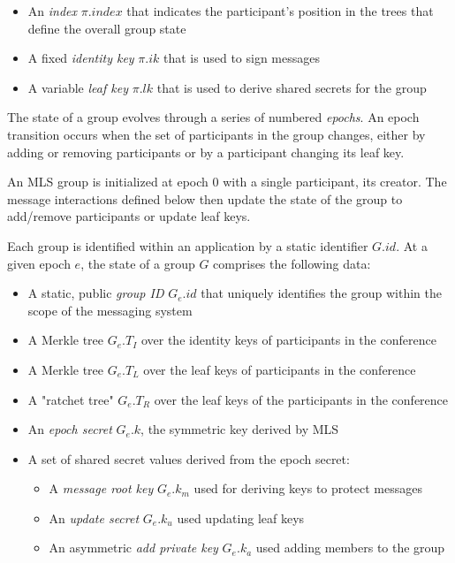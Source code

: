 \documentclass[11pt, oneside]{article}
\newcommand{\protoname}{MLS\xspace}
\begin{document}
\begin{itemize}
\item{An \emph{index} $\pi.index$ that indicates the participant's position in the trees that define the overall group state}
\item{A fixed \emph{identity key} $\pi.ik$ that is used to sign messages}
\item{A variable \emph{leaf key} $\pi.lk$ that is used to derive shared secrets for the group}
\end{itemize}

The state of a group evolves through a series of numbered \emph{epochs}.  An epoch transition occurs when the set of participants in the group changes, either by adding or removing participants or by a participant changing its leaf key.

An MLS group is initialized at epoch 0 with a single participant, its creator.  The message interactions defined below then update the state of the group to add/remove participants or update leaf keys.

Each group is identified within an application by a static identifier $G.id$. At a given epoch $e$, the state of a group $G$ comprises the following data:

\begin{itemize}
\item A static, public \emph{group ID} $G_e.id$ that uniquely identifies the group within the scope of the messaging system
\item A Merkle tree $G_e.T_I$ over the identity keys of participants in the conference
\item A Merkle tree $G_e.T_L$ over the leaf keys of participants in the conference
\item A "ratchet tree" $G_e.T_R$ over the leaf keys of the participants in the conference
\item An \emph{epoch secret} $G_e.k$, the symmetric key derived by \protoname
\item A set of shared secret values derived from the epoch secret:
	\begin{itemize}
	\item A \emph{message root key} $G_e.k_m$ used for deriving keys to protect messages
	\item An \emph{update secret}  $G_e.k_u$ used updating leaf keys
	\item An asymmetric \emph{add private key} $G_e.k_a$ used adding members to the group
	\end{itemize}
\end{itemize}
\end{document}
